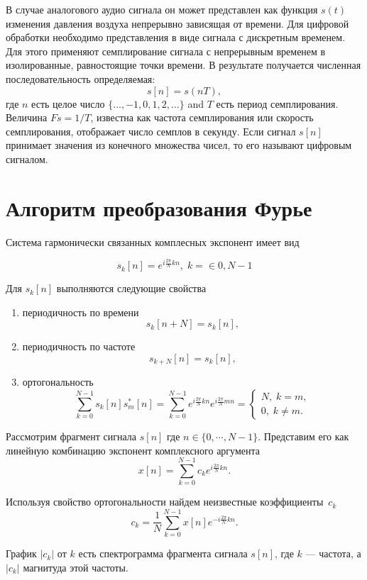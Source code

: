 \documentclass[oneside, final, 14pt]{extarticle}
\begin{document}
  В случае аналогового аудио сигнала он может представлен как функция $s(t)$ изменения давления воздуха непрерывно
  зависящая от времени. Для цифровой обработки необходимо представления в виде сигнала с дискретным временем. Для
  этого применяют семплирование сигнала с непрерывным временем в изолированные, равностоящие точки времени. В результате
  получается численная последовательность определяемая:
  \[
    s[n] = s(nT),
  \]
  где $n$ есть целое число $\{\dots, -1, 0, 1, 2, \dots\}$ and $T$ есть период семплирования. Величина $Fs=1/T$, известна
  как частота семплирования или скорость семплирования, отображает число семплов в секунду. Если сигнал $s[n]$ принимает
  значения из конечного множества чисел, то его называют цифровым сигналом.

\cleardoublepage
\section{Алгоритм преобразования Фурье}
  Система гармонически связанных комплесных экспонент имеет вид

  \[
    s_k[n]=e^{i\tfrac{2\pi}{N}kn}, \; k=\in{0,N-1}
  \]

  Для $s_k[n]$ выполняются следующие свойства

  \begin{enumerate}
  \item периодичность по времени \[
    s_k[n + N] = s_k[n],
  \]
  \item периодичность по частоте
  \[
    s_{k+N}[n] = s_k[n],
  \]
  \item ортогональность
  \[
    \sum_{k=0}^{N-1} s_k[n]s_m^*[n] = \sum_{k=0}^{N-1} e^{i\tfrac{2\pi}{N}kn} e^{i\tfrac{2\pi}{N}mn} =
    \left\{ \begin{aligned}
        N, \; k = m ,\\
        0, \; k \not= m.
      \end{aligned}
    \right.
  \]
  \end{enumerate}

  Рассмотрим фрагмент сигнала $s[n]$ где $n \in \{0,\cdots,N-1\}$. Представим его как линейную комбинацию экспонент комплексного
  аргумента
  \[
    x[n] = \sum_{k=0}^{N-1} c_k e^{i\tfrac{2\pi}{N}kn}.
  \]

  Используя свойство ортогональности найдем неизвестные коэффициенты~$c_k$
  \[
    c_k = \dfrac{1}{N} \sum_{k=0}^{N-1} x[n] e^{-i\tfrac{2\pi}{N}kn}.
  \]

  График $|c_k|$ от $k$ есть спектрограмма фрагмента сигнала $s[n]$, где $k$ --- частота,
  а $|c_k|$ магнитуда этой частоты.
\end{document}
